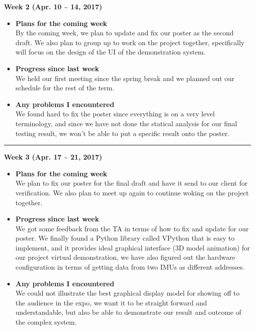 	\begin{center}
		\textbf{Week 2 (Apr. 10 {\textasciitilde{}} 14, 2017)}
	\end{center}
	\begin{itemize}
		\item \textbf{Plans for the coming week}
		\\By the coming week, we plan to update and fix our poster as the second draft. We also plan to group up to work on the project together, specifically will focus on the design of the UI of the demonstration system.\\

		\item \textbf{Progress since last week}
		\\We held our first meeting since the spring break and we planned out our schedule for the rest of the term.\\

		\item \textbf{Any problems I encountered}
		\\We found hard to fix the poster since everything is on a very level terminology, and since we have not done the statical analysis for our final testing result, we won't be able to put a specific result onto the poster.\\
	\end{itemize}

	\rule{\textwidth}{0.5pt}

	\begin{center}
		\textbf{Week 3 (Apr. 17 {\textasciitilde{}} 21, 2017)}
	\end{center}
	\begin{itemize}
		\item \textbf{Plans for the coming week}
		\\We plan to fix our poster for the final draft and have it send to our client for verification. We also plan to meet up again to continue woking on the project together.\\

		\item \textbf{Progress since last week}
		\\We got some feedback from the TA in terms of how to fix and update for our poster. We finally found a Python library called VPython that is easy to implement, and it provides ideal graphical interface (3D model animation) for our project virtual demonstration, we have also figured out the hardware configuration in terms of getting data from two IMUs as different addresses.\\

		\item \textbf{Any problems I encountered}
		\\We could not illustrate the best graphical display model for showing off to the audience in the expo, we want it to be straight forward and understandable, but also be able to demonstrate our result and outcome of the complex system.\\
	\end{itemize}

